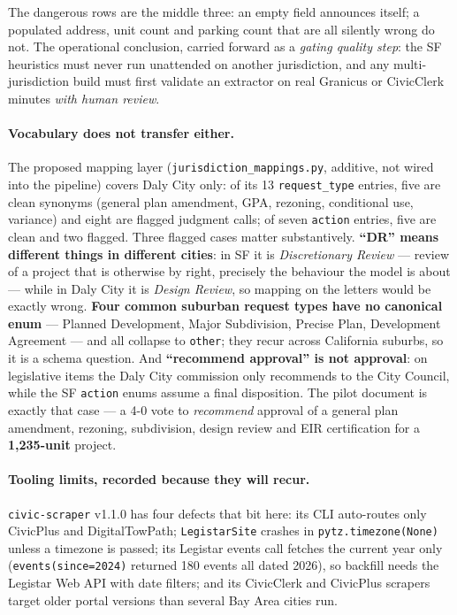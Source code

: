 \documentclass[11pt]{article}
\begin{document}
The dangerous rows are the middle three: an empty field announces itself; a populated address,
unit count and parking count that are all silently wrong do not. The operational conclusion,
carried forward as a \emph{gating quality step}: the SF heuristics must never run unattended on
another jurisdiction, and any multi-jurisdiction build must first validate an extractor on real
Granicus or CivicClerk minutes \emph{with human review}.

\paragraph{Vocabulary does not transfer either.} The proposed mapping layer
(\texttt{jurisdiction\_mappings.py}, additive, not wired into the pipeline) covers Daly City
only: of its 13 \texttt{request\_type} entries, five are clean synonyms (general plan amendment,
GPA, rezoning, conditional use, variance) and eight are flagged judgment calls; of seven
\texttt{action} entries, five are clean and two flagged. Three flagged cases matter
substantively. \textbf{``DR'' means different things in different cities}: in SF it is
\emph{Discretionary Review} --- review of a project that is otherwise by right, precisely the
behaviour the model is about --- while in Daly City it is \emph{Design Review}, so mapping on the
letters would be exactly wrong. \textbf{Four common suburban request types have no canonical
enum} --- Planned Development, Major Subdivision, Precise Plan, Development Agreement --- and all
collapse to \texttt{other}; they recur across California suburbs, so it is a schema question. And
\textbf{``recommend approval'' is not approval}: on legislative items the Daly City commission
only recommends to the City Council, while the SF \texttt{action} enums assume a final
disposition. The pilot document is exactly that case --- a 4-0 vote to \emph{recommend} approval
of a general plan amendment, rezoning, subdivision, design review and EIR certification for a
\textbf{1,235-unit} project.

\paragraph{Tooling limits, recorded because they will recur.} \texttt{civic-scraper} v1.1.0 has
four defects that bit here: its CLI auto-routes only CivicPlus and DigitalTowPath;
\texttt{LegistarSite} crashes in \texttt{pytz.timezone(None)} unless a timezone is passed; its
Legistar events call fetches the current year only (\texttt{events(since=2024)} returned 180
events all dated 2026), so backfill needs the Legistar Web API with date filters; and its
CivicClerk and CivicPlus scrapers target older portal versions than several Bay Area cities run.
\end{document}
